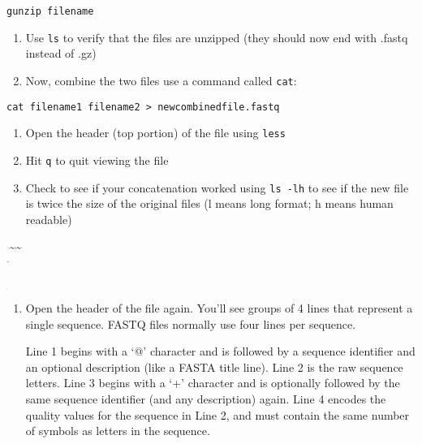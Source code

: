 \documentclass[]{article}
\begin{document}
\texttt{gunzip\ \textquotesingle{}filename\textquotesingle{}}

\begin{enumerate}
\def\labelenumi{\arabic{enumi}.}
\setcounter{enumi}{9}
\item
  Use \texttt{ls} to verify that the files are unzipped (they should now
  end with .fastq instead of .gz)
\item
  Now, combine the two files use a command called \texttt{cat}:
\end{enumerate}

\texttt{cat\ filename1\ filename2\ \textgreater{}\ newcombinedfile.fastq}

\begin{enumerate}
\def\labelenumi{\arabic{enumi}.}
\setcounter{enumi}{11}
\item
  Open the header (top portion) of the file using \texttt{less}
\item
  Hit \texttt{q} to quit viewing the file
\item
  Check to see if your concatenation worked using \texttt{ls\ -lh} to
  see if the new file is twice the size of the original files (l means
  long format; h means human readable)
\end{enumerate}

\textsubscript{\textsubscript{\textsubscript{\textsubscript{\textsubscript{\textsubscript{\textsubscript{\textsubscript{\textsubscript{\textsubscript{\textsubscript{\textsubscript{\textsubscript{\textsubscript{\textsubscript{\textsubscript{\textsubscript{\textsubscript{\textsubscript{\textsubscript{\textsubscript{\textsubscript{\textsubscript{\textsubscript{\textsubscript{\textsubscript{\textsubscript{\textsubscript{\textsubscript{\textsubscript{\sout{BREAK}}}}}}}}}}}}}}}}}}}}}}}}}}}}}}\textsubscript{\textsubscript{\textsubscript{\textsubscript{\textasciitilde{}}}}}}\textasciitilde{}\textasciitilde{}

\begin{enumerate}
\def\labelenumi{\arabic{enumi}.}
\setcounter{enumi}{14}
\item
  Open the header of the file again. You'll see groups of 4 lines that
  represent a single sequence. FASTQ files normally use four lines per
  sequence.

  Line 1 begins with a `@' character and is followed by a sequence
  identifier and an optional description (like a FASTA title line). Line
  2 is the raw sequence letters. Line 3 begins with a `+' character and
  is optionally followed by the same sequence identifier (and any
  description) again. Line 4 encodes the quality values for the sequence
  in Line 2, and must contain the same number of symbols as letters in
  the sequence.
\end{enumerate}
\end{document}
